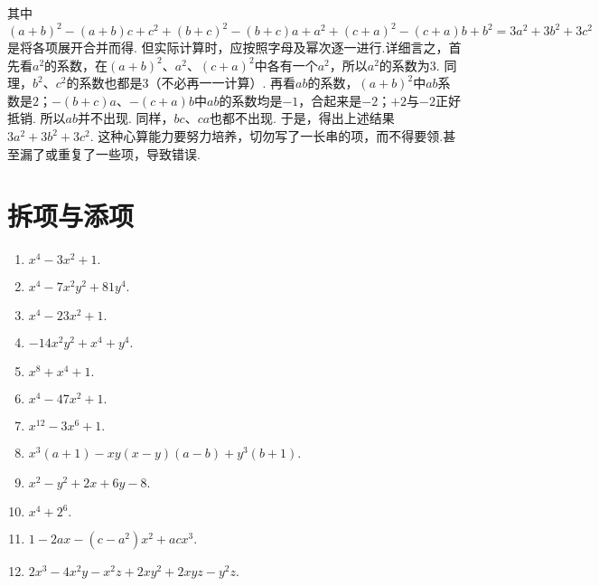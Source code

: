 \documentclass[a4paper,12pt]{article}
\begin{document}
{其中$( a + b ) ^ { 2 } - ( a + b ) c + c ^ { 2 } + ( b + c ) ^ { 2 } - ( b + c ) a + a ^ { 2 } + ( c + a ) ^ { 2 } - ( c + a ) b + b ^ { 2 } = 3 a ^ { 2 } + 3 b ^ { 2 } + 3 c ^ { 2 }$是将各项展开合并而得. 但实际计算时，应按照字母及幂次逐一进行.详细言之，首先看$a^2$的系数，在$(a+b)^2$、$a^2$、$(c+a)^2$中各有一个$a^2$，所以$a^2$的系数为$3$. 同理，$b^2$、$c^2$的系数也都是$3$（不必再一一计算）. 再看$ab$的系数，$(a+b)^2$中$ab$系数是$2$；$-(b+c)a$、$-(c+a)b$中$ab$的系数均是$-1$，合起来是$-2$；$+2$与$-2$正好抵销. 所以$ab$并不出现. 同样，$bc$、$ca$也都不出现. 于是，得出上述结果$3a^2+3b^2+3c^2$. 这种心算能力要努力培养，切勿写了一长串的项，而不得要领.甚至漏了或重复了一些项，导致错误.

}

\section{拆项与添项}

\begin{multicols}{2}
\begin{enumerate}
\item $x ^ { 4 } - 3 x ^ { 2 } + 1 .$

\item $x ^ { 4 } - 7 x ^ { 2 } y ^ { 2 } + 8 1 y ^ { 4 } .$

\item $x ^ { 4 } - 2 3 x ^ { 2 } + 1 .$

\item $- 1 4 x ^ { 2 } y ^ { 2 } + x ^ { 4 } + y ^ { 4 } .$

\item $x ^ { 8 } + x ^ { 4 } + 1 .$

\item $x ^ { 4 } - 4 7 x ^ { 2 } + 1 .$

\item $x ^ { 1 2 } - 3 x ^ { 6 } + 1 .$

\item $x ^ { 3 } ( a + 1 ) - x y ( x - y ) ( a - b ) + y ^ { 3 } ( b + 1 ) .$

\item $x ^ { 2 } - y ^ { 2 } + 2 x + 6 y - 8 .$

\item $x ^ { 4 } + 2 ^ { 6 } .$

\item $1 - 2 a x - ( c - a ^ { 2 } ) x ^ { 2 } + a c x ^ { 3 } .$

\item $2 x ^ { 3 } - 4 x ^ { 2 } y - x ^ { 2 } z + 2 x y ^ { 2 } + 2 x y z - y ^ { 2 } z .$
\end{enumerate}
\end{multicols}
\end{document}

